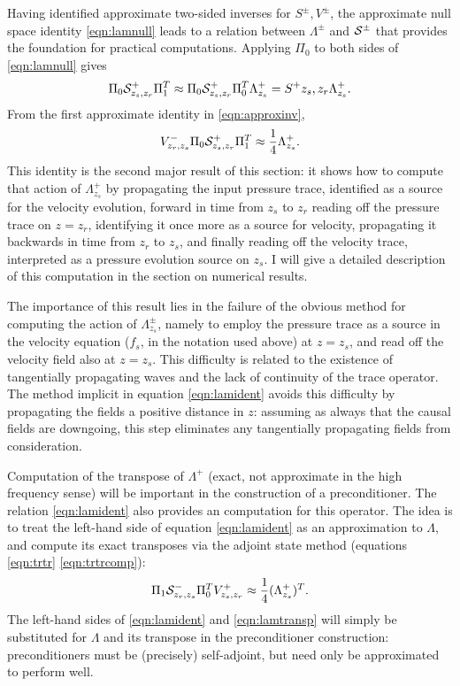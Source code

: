 Having identified approximate two-sided inverses for $S^{\pm},
V^{\pm}$, the approximate null space identity \ref{eqn:lamnull} leads
to a relation between $\Lambda^{\pm}$ and ${\cal S}^{\pm}$ that
provides the foundation for practical computations. Applying $\Pi_0$
to both sides of \ref{eqn:lamnull} gives
\[
 \Pi_0 {\cal S}^+_{z_s,z_r}\Pi_1^T \approx \Pi_0 {\cal S}^+_{z_s,z_r}\Pi_0^T
 \Lambda^+_{z_s} = S^+{z_s,z_r} \Lambda^+_{z_s}.
\]
From the first approximate identity in \ref{eqn:approxinv},
\begin{equation}
  \label{eqn:lamident}
  V^{-}_{z_r,z_s}\Pi_0 {\cal S}^+_{z_s,z_r}\Pi_1^T \approx \frac{1}{4}\Lambda^+_{z_s}.
\end{equation}
This identity is the second major result of this section: it shows how
to compute that action of $\Lambda^+_{z_s}$ by propagating the input
pressure trace, identified as a source for the velocity evolution,
forward in time from $z_s$ to $z_r$
reading off the pressure trace on $z=z_r$, identifying it once more as
a source for velocity, propagating it backwards in time from $z_r$ to
$z_s$, and finally reading off the velocity trace, interpreted as a
pressure evolution source on $z_s$. I will give a detailed description
of this computation in the section on numerical results.

The importance of this result lies in the failure of the obvious
method for computing the action of $\Lambda^{\pm}_{z_s}$, namely to
employ the pressure trace as a source in the velocity equation ($f_s$,
in the notation used above) at $z=z_s$, and read off the velocity
field also at $z=z_s$. This difficulty is related to the existence of
tangentially propagating waves and the lack of continuity of the trace
operator. The method implicit in equation \ref{eqn:lamident} avoids
this difficulty by propagating the fields a positive distance in $z$:
assuming as always that the causal fields are downgoing, this step
eliminates any tangentially propagating fields from consideration.

Computation of the transpose of $\Lambda^+$ (exact, not approximate in
the high frequency sense) will be important in the
construction of a preconditioner. The relation \ref{eqn:lamident} also
provides an computation for this operator. The idea is to treat the
left-hand side of equation \ref{eqn:lamident} as an approximation to
$\Lambda$, and compute its exact transposes via the adjoint state
method (equations \ref{eqn:trtr} \ref{eqn:trtrcomp}):
\begin{equation}
  \label{eqn:lamtransp}
   \Pi_1 {\cal S}^-_{z_r,z_s}\Pi_0^T V^{+}_{z_s,z_r} \approx \frac{1}{4}(\Lambda^+_{z_s})^T.
\end{equation} 
The left-hand sides of \ref{eqn:lamident} and \ref{eqn:lamtransp} will
simply be substituted for $\Lambda$ and its transpose in the
preconditioner construction: preconditioners must be (precisely)
self-adjoint, but need only be approximated to perform well.

